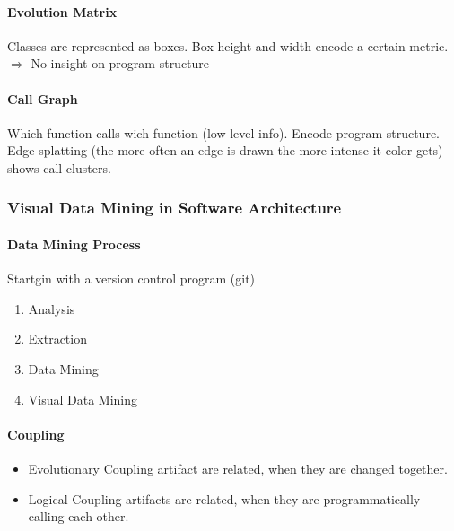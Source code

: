 \documentclass[ngerman]{scrartcl}
\begin{document}
\paragraph{Evolution Matrix} Classes are represented as boxes. Box height and width encode a certain metric. $ \Rightarrow $ No insight on program structure

\paragraph{Call Graph} Which function calls wich function (low level info). Encode program structure. Edge splatting (the more often an edge is drawn the more intense it color gets) shows call clusters.

\subsubsection{Visual Data Mining in Software Architecture}
\paragraph{Data Mining Process}
Startgin with a version control program (git)
\begin{enumerate}
  \item Analysis
  \item Extraction
  \item Data Mining
  \item Visual Data Mining
\end{enumerate} 


\paragraph{Coupling}
\begin{itemize}
  \item Evolutionary Coupling artifact are related, when they are changed together.
  \item Logical Coupling artifacts are related, when they are programmatically calling each other.
\end{itemize}
\end{document}

